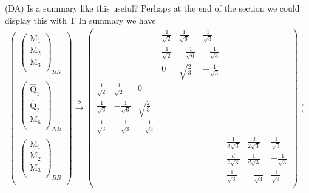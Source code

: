 \documentclass[12pt,a4paper]{article}
\newcounter{arrow}
\newcommand{\dave}[1]{{\color{ao(english)}\footnotesize{(DA) #1}}}
\begin{document}
\dave{Is a summary like this useful? Perhaps at the end of the section we could display this with T}
In summary we have
\begin{align}
\left(\begin{matrix}
\left( \begin{matrix}
\text{M}_1\\
\text{M}_2\\
\text{M}_3\\
\end{matrix} \right)_{BN} \\
\\
\left( \begin{matrix}
\widehat{\text{Q}}_1\\
\widehat{\text{Q}}_2\\
\text{M}_6\\
\end{matrix} \right)_{NB}\\
\\
\left( \begin{matrix}
\text{M}_1\\
\text{M}_2\\
\text{M}_3\\
\end{matrix} \right)_{BB} \\
\end{matrix} \right)
\xrightarrow{S} \left( \begin{matrix}
&&&			\frac{1}{\sqrt{2}} & \frac{1}{\sqrt{6}} &  \frac{1}{\sqrt{3}} &			&&\\
&&&			\frac{1}{\sqrt{2}} & - \frac{1}{\sqrt{6}} & -\frac{1}{\sqrt{3}}& 			&&\\
&&&			0& \sqrt{\frac{2}{3}} & -\frac{1}{\sqrt{3}}& 			&&\\
\frac{1}{\sqrt{2}}& \frac{1}{\sqrt{2}}& 0&			&&& 			&&\\
\frac{1}{\sqrt{6}} & - \frac{1}{\sqrt{6}} & \sqrt{\frac{2}{3}}&			&&& 			&&\\
\frac{1}{\sqrt{3}} & - \frac{1}{\sqrt{3}} & - \frac{1}{\sqrt{3}}&			&&& 			&&\\
&&&			&&&			\frac{1}{d\sqrt{3}} & \frac{d}{2\sqrt{3}} & \frac{1}{\sqrt{3}}\\
&&&			&&& 			\frac{d}{2\sqrt{3}} & \frac{1}{d\sqrt{3}} & -\frac{1}{\sqrt{3}}\\
&&&			&&& 			\frac{1}{\sqrt{3}} & -\frac{1}{\sqrt{3}} & \frac{1}{\sqrt{3}}\\
\end{matrix} \right)
\left(\begin{matrix}

\end{matrix}
\end{align}
\end{document}
